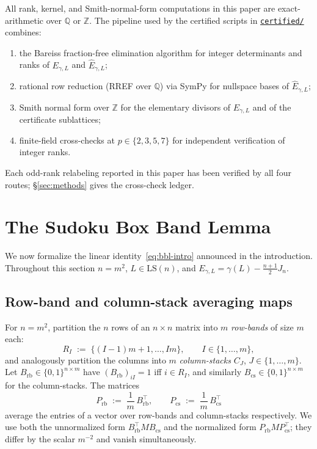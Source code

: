 \documentclass[11pt,a4paper]{article}
\theoremstyle{definition}
\theoremstyle{remark}
\providecommand{\Z}{\mathbb{Z}}
\providecommand{\Q}{\mathbb{Q}}
\newcommand{\Egamma}{E_{\gamma,L}}
\newcommand{\Ehat}{\widehat{E}_{\gamma,L}}
\newcommand{\Prb}{P_{\mathrm{rb}}}
\newcommand{\Pcs}{P_{\mathrm{cs}}}
\begin{document}
All rank, kernel, and Smith-normal-form computations in this paper
are exact-arithmetic over $\Q$ or $\Z$. The pipeline used by the
certified scripts in
\href{../certified/}{\texttt{certified/}}
combines:
\begin{enumerate}[label=(\roman*),leftmargin=*]
   \item the Bareiss fraction-free elimination algorithm
   \cite{Bareiss68} for integer determinants and ranks of
   $\Egamma$ and $\Ehat$;
   \item rational row reduction (RREF over $\Q$) via SymPy for
   nullspace bases of $\Ehat$;
   \item Smith normal form over $\Z$ for the elementary divisors of
   $\Egamma$ and of the certificate sublattices;
   \item finite-field cross-checks at $p \in \{2, 3, 5, 7\}$ for
   independent verification of integer ranks.
\end{enumerate}
Each odd-rank relabeling reported in this paper has been verified by
all four routes; \S\ref{sec:methods} gives the cross-check ledger.

\section{The Sudoku Box Band Lemma}\label{sec:bbl}

We now formalize the linear identity~\eqref{eq:bbl-intro} announced in
the introduction. Throughout this section $n = m^2$, $L \in
\mathrm{LS}(n)$, and $\Egamma = \gamma(L) - \tfrac{n+1}{2} J_n$.

\subsection{Row-band and column-stack averaging maps}\label{sec:bbl-proj}

For $n = m^2$, partition the $n$ rows of an $n \times n$ matrix into
$m$ \emph{row-bands} of size $m$ each:
\begin{equation*}
   R_I \;:=\; \{ (I-1)m + 1, \dots, Im \},
   \qquad I \in \{1, \dots, m\},
\end{equation*}
and analogously partition the columns into $m$ \emph{column-stacks}
$C_J$, $J \in \{1, \dots, m\}$. Let $B_{\mathrm{rb}} \in \{0,1\}^{n
\times m}$ have $(B_{\mathrm{rb}})_{iI} = 1$ iff $i \in R_I$, and
similarly $B_{\mathrm{cs}} \in \{0,1\}^{n \times m}$ for the
column-stacks. The matrices
\begin{equation}\label{eq:Prb-Pcs}
   \Prb \;:=\; \frac{1}{m}\, B_{\mathrm{rb}}^{\!\top},
   \qquad
   \Pcs \;:=\; \frac{1}{m}\, B_{\mathrm{cs}}^{\!\top}
\end{equation}
average the entries of a vector over row-bands and column-stacks
respectively. We use both the unnormalized form $B_{\mathrm{rb}}^{\!\top} M
B_{\mathrm{cs}}$ and the normalized form $\Prb M \Pcs^{\!\top}$; they
differ by the scalar $m^{-2}$ and vanish simultaneously.
\end{document}
